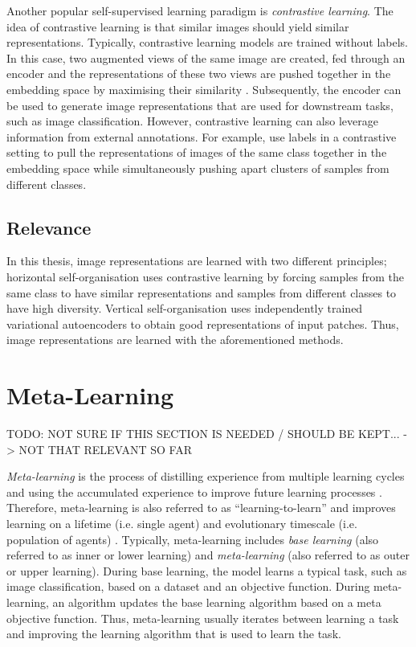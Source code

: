 Another popular self-supervised learning paradigm is \emph{contrastive learning}.
The idea of contrastive learning is that similar images should yield similar representations.
Typically, contrastive learning models are trained without labels.
In this case, two augmented views of the same image are created, fed through an encoder and the representations of these two views are pushed together in the embedding space by maximising their similarity .
Subsequently, the encoder can be used to generate image representations that are used for downstream tasks, such as image classification.
However, contrastive learning can also leverage information from external annotations.
For example,  use labels in a contrastive setting to pull the representations of images of the same class together in the embedding space while simultaneously pushing apart clusters of samples from different classes.

\subsection{Relevance}
In this thesis, image representations are learned with two different principles;
horizontal self-organisation uses contrastive learning by forcing samples from the same class to have similar representations and samples from different classes to have high diversity.
Vertical self-organisation uses independently trained variational autoencoders to obtain good representations of input patches.
Thus, image representations are learned with the aforementioned methods.


\section{Meta-Learning}
TODO: NOT SURE IF THIS SECTION IS NEEDED / SHOULD BE KEPT... -> NOT THAT RELEVANT SO FAR

\emph{Meta-learning} is the process of distilling experience from multiple learning cycles and using the accumulated experience to improve future learning processes .
Therefore, meta-learning is also referred to as ``learning-to-learn''  and improves learning on a lifetime (i.e. single agent) and evolutionary timescale (i.e. population of agents) .
Typically, meta-learning includes \emph{base learning} (also referred to as inner or lower learning) and \emph{meta-learning} (also referred to as outer or upper learning).
During base learning, the model learns a typical task, such as image classification, based on a dataset and an objective function.
During meta-learning, an algorithm updates the base learning algorithm based on a meta objective function.
Thus, meta-learning usually iterates between learning a task and improving the learning algorithm that is used to learn the task.

